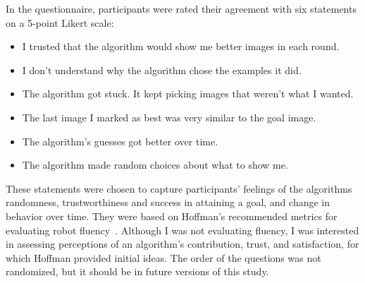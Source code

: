 In the questionnaire, participants were rated their agreement with six statements on a 5-point Likert scale:
\begin{itemize}[noitemsep]
\item I trusted that the algorithm would show me better images in each round.
\item I don't understand why the algorithm chose the examples it did.
\item The algorithm got stuck.  It kept picking images that weren't what I wanted.
\item The last image I marked as best was very similar to the goal image.
\item The algorithm's guesses got better over time.
\item The algorithm made random choices about what to show me.
\end{itemize}
These statements were chosen to capture participants' feelings of the algorithms randomness, trustworthiness and success in attaining a goal, and change in behavior over time.
They were based on Hoffman's recommended metrics for evaluating robot fluency~\cite{hoffman_evaluating_2013}.
Although I was not evaluating fluency, I was interested in assessing perceptions of an algorithm's contribution, trust, and satisfaction, for which Hoffman provided initial ideas.
The order of the questions was not randomized, but it should be in future versions of this study.
